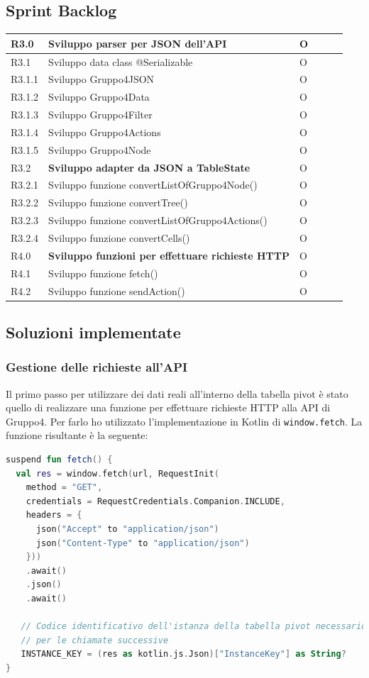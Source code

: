 \subsection{Sprint Backlog}
\begin{longtable} {
		|>{}p{10mm}| 
		|>{}p{90mm}|
		|>{}p{15mm}|
		|>{}p{15mm}|
		|>{}p{15mm}|
		>{}p{0mm}}
	\hline
	R3.0   & \textbf{Sviluppo parser per JSON dell'API}         & O\\ \hline
	R3.1   & Sviluppo data class @Serializable 	   & O\\ \hline
	R3.1.1 & Sviluppo Gruppo4JSON & O\\ \hline
	R3.1.2 & Sviluppo Gruppo4Data & O\\ \hline
	R3.1.3 & Sviluppo Gruppo4Filter & O\\ \hline
	R3.1.4 & Sviluppo Gruppo4Actions & O\\ \hline
	R3.1.5 & Sviluppo Gruppo4Node & O\\ \hline
	R3.2   & \textbf{Sviluppo adapter da JSON a TableState} & O\\ \hline
	R3.2.1   & Sviluppo funzione convertListOfGruppo4Node() & O\\ \hline
	R3.2.2   & Sviluppo funzione convertTree() & O \\ \hline
	R3.2.3   & Sviluppo funzione convertListOfGruppo4Actions() & O\\ \hline
	R3.2.4   & Sviluppo funzione convertCells() & O\\ \hline
	
	R4.0 & \textbf{Sviluppo funzioni per effettuare richieste HTTP}  & O    \\ \hline
	R4.1   & Sviluppo funzione fetch() & O     \\ \hline
	R4.2   & Sviluppo funzione sendAction() & O    \\ \hline
\end{longtable}

\subsection{Soluzioni implementate}
\subsubsection{Gestione delle richieste all'API}
Il primo passo per utilizzare dei dati reali all'interno della tabella pivot è stato quello di realizzare una funzione per effettuare richieste HTTP alla API di Gruppo4. Per farlo ho utilizzato l'implementazione in Kotlin di \verb|window.fetch|. La funzione risultante è la seguente:
\begin{lstlisting}[caption={Funzione fetch()}, label={lst:bodycells}, language=Kotlin]
suspend fun fetch() {
  val res = window.fetch(url, RequestInit(
    method = "GET",
    credentials = RequestCredentials.Companion.INCLUDE,
    headers = {
      json("Accept" to "application/json")
      json("Content-Type" to "application/json")
    }))
    .await()
    .json()
    .await()

   // Codice identificativo dell'istanza della tabella pivot necessario
   // per le chiamate successive
   INSTANCE_KEY = (res as kotlin.js.Json)["InstanceKey"] as String?
}
\end{lstlisting}

